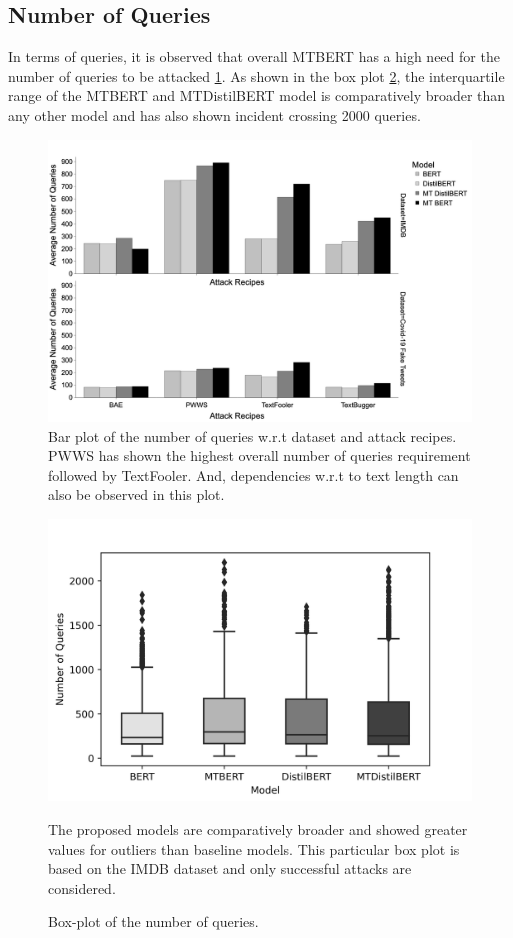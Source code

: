 \documentclass[%
	BCOR=8mm, %
	DIV=12,
	toc=bibliography, %
	toc=listof, %
	oneside, %
	egregdoesnotlikesansseriftitles, %
	]{scrbook}
\begin{document}
\subsection{Number of Queries}
In terms of queries, it is observed that overall MTBERT has a high need for the number of queries to be attacked \ref{fig:avgnquebyattackrecipes}. As shown in the box plot \ref{fig:numofqueriesdist}, the interquartile range of the MTBERT and MTDistilBERT model is comparatively broader than any other model and has also shown incident crossing 2000 queries. 
\begin{figure}[H]
	\centering
     \hspace*{2.5em}
    \includegraphics[width=.95\linewidth]{img/AvgNQuebyDataset}
	\caption[Bar plot of the number of queries]{Bar plot of the number of queries w.r.t dataset and attack recipes. PWWS has shown the highest overall number of queries requirement followed by TextFooler.  And, dependencies w.r.t to text length can also be observed in this plot.}
	\label{fig:avgnquebyattackrecipes}
\end{figure}
\begin{figure}[H]
    \centering
    \includegraphics[width=0.75\linewidth]{img/NumQueriesDist_IMDB.png}
    \caption{Box-plot of the number of queries.}{ The proposed models are comparatively broader and showed greater values for outliers than baseline models. This particular box plot is based on the IMDB dataset and only successful attacks are considered.}
    \label{fig:numofqueriesdist}
\end{figure}
\end{document}

